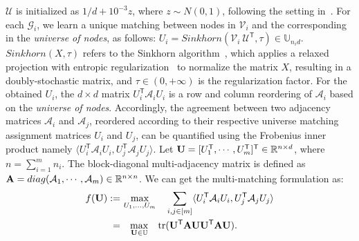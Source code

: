 $\mathcal{U}$ is initialized as $1/d + 10^{-3}z$, where $z \sim N(0, 1)$, following the setting in~\cite{wang2020graduated}. For each $\mathcal{G}_i$, we learn a unique matching between nodes in $\mathcal{V}_i$ and the corresponding in the \textit{universe of nodes}, as follows: $U_i = Sinkhorn(\mathcal{V}_i \ \mathcal{U}^{\mathsf{T}}, \tau) \in \mathbb{U}_{n_i d}$. $Sinkhorn(X, \tau)$ refers to the Sinkhorn algorithm~\cite{sinkhorn1964relationship,cuturi2013sinkhorn}, which applies a relaxed projection with entropic regularization~\cite{gold1996softmax} to normalize the matrix $X$, resulting in a doubly-stochastic matrix, and $\tau \in (0,+\infty)$ is the regularization factor. For the obtained $U_i$, the $d\times d$ matrix $U_i^{\mathsf{T}} \mathcal{A}_i U_i$ is a row and column reordering of $\mathcal{A}_i$ based on the \textit{universe of nodes}. Accordingly, the agreement between two adjacency matrices $\mathcal{A}_i$ and $\mathcal{A}_j$, reordered according to their respective universe matching assignment matrices $U_i$ and $U_j$, can be quantified using the Frobenius inner product namely $\langle U_i^{\mathsf{T}} \mathcal{A}_i U_i, U_j^{\mathsf{T}} \mathcal{A}_j U_j\rangle$. Let $\bold{U} = [U_1^{\mathsf{T}}, \cdots, U_m^{\mathsf{T}}]^{\mathsf{T}} \in \mathbb{R}^{n\times d}$, where $n = \sum_{i=1}^{m}n_i$. The block-diagonal multi-adjacency matrix is defined as $\bold{A} = diag(\mathcal{A}_1, \cdots, \mathcal{A}_m) \in \mathbb{R}^{n\times n}$. We can get the multi-matching formulation as:
\vspace{-5pt}
\begin{align}
    f(\bold{U}) := &\ \underset{U_1, \dots, U_m}{\max} \quad \sum_{i,j \in [m]} \langle U_i^{\mathsf{T}} \mathcal{A}_i U_i, U_j^{\mathsf{T}} \mathcal{A}_j U_j \rangle \nonumber \\ 
     = &\quad \underset{\bold{U} \in \mathbb{U}}{\max} \quad \text{tr}(\bold{U}^{\mathsf{T}} \bold{A} \bold{U} \bold{U}^{\mathsf{T}} \bold{A} \bold{U}) \label{eq6}.
\end{align}

